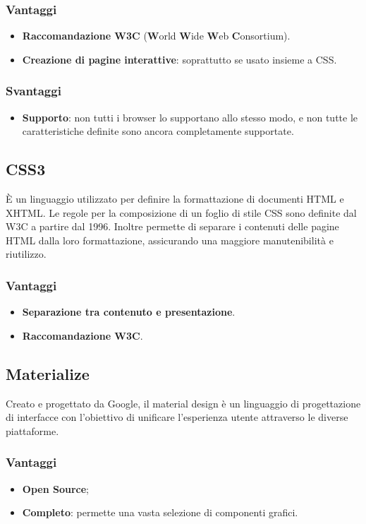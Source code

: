 \subsubsection{Vantaggi}
\begin{itemize}
\item \textbf{Raccomandazione W3C} (\textbf{W}orld \textbf{W}ide \textbf{W}eb \textbf{C}onsortium).
\item \textbf{Creazione di pagine interattive}: soprattutto se usato insieme a CSS.
\end{itemize}
\subsubsection{Svantaggi}
\begin{itemize}
\item \textbf{Supporto}: non tutti i browser lo supportano allo stesso modo, e non tutte le caratteristiche definite sono ancora completamente supportate.
\end{itemize}
\subsection{CSS3}
\`E un linguaggio utilizzato per definire la formattazione di documenti HTML e XHTML. Le regole per la composizione di un foglio di stile CSS sono definite dal W3C a partire dal 1996. Inoltre permette di separare i contenuti delle pagine HTML dalla loro formattazione, assicurando una maggiore manutenibilit\`a e riutilizzo.
\subsubsection{Vantaggi}
\begin{itemize}
\item \textbf{Separazione tra contenuto e presentazione}.
\item \textbf{Raccomandazione W3C}.
\end{itemize}
\subsection{Materialize}
Creato e progettato da Google, il material design è un linguaggio di progettazione di interfacce con l'obiettivo di unificare l'esperienza utente attraverso le diverse piattaforme.
\subsubsection{Vantaggi}
\begin{itemize}
\item \textbf{Open Source};
\item \textbf{Completo}: permette una vasta selezione di componenti grafici.
\end{itemize}
